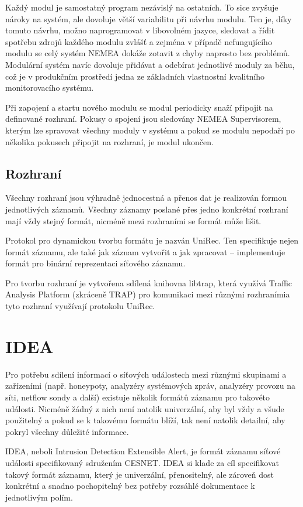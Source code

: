 Každý modul je samostatný program nezávislý na ostatních. To sice zvyšuje nároky na systém, ale dovoluje větší variabilitu při návrhu modulu. Ten je, díky tomuto návrhu, možno naprogramovat v libovolném jazyce, sledovat a řídit spotřebu zdrojů každého modulu zvlášť a zejména v případě nefungujícího modulu se celý systém NEMEA dokáže zotavit z chyby naprosto bez problémů. Modulární systém navíc dovoluje přidávat a odebírat jednotlivé moduly za běhu, což je v produkčním prostředí jedna ze základních vlastnostní kvalitního monitorovacího systému.

Při zapojení a startu nového modulu se modul periodicky snaží připojit na definované rozhraní. Pokusy o spojení jsou sledovány NEMEA Supervisorem, kterým lze spravovat všechny moduly v systému a pokud se modulu nepodaří po několika pokusech připojit na rozhraní, je modul ukončen.

\subsection{Rozhraní}

Všechny rozhraní jsou výhradně jednocestná a přenos dat je realizován formou jednotlivých záznamů. Všechny záznamy poslané přes jedno konkrétní rozhraní mají vždy stejný formát, nicméně mezi rozhraními se formát může lišit. 

Protokol pro dynamickou tvorbu formátu je nazván UniRec. Ten specifikuje nejen formát záznamu, ale také jak záznam vytvořit a jak zpracovat -- implementuje formát pro binární reprezentaci síťového záznamu.

Pro tvorbu rozhraní je vytvořena sdílená knihovna libtrap, která využívá Traffic Analysis Platform (zkráceně TRAP) pro komunikaci mezi různými rozhranímia tyto rozhraní využívají protokolu UniRec.

\section{IDEA}
\label{sec:idea}

Pro potřebu sdílení informací o síťových událostech mezi různými skupinami a zařízeními (např. honeypoty, analyzéry systémových zpráv, analyzéry provozu na síti, netflow sondy a další) existuje několik formátů záznamu pro takovéto události. Nicméně žádný z nich není natolik univerzální, aby byl vždy a všude použitelný a pokud se k takovému formátu blíží, tak není natolik detailní, aby pokryl všechny důležité informace.

IDEA, neboli Intrusion Detection Extensible Alert, je formát záznamu síťové události specifikovaný sdružením CESNET. IDEA si klade za cíl specifikovat takový formát záznamu, který je univerzální, přenositelný, ale zároveň dost konkrétní a snadno pochopitelný bez potřeby rozsáhlé dokumentace k jednotlivým polím.

